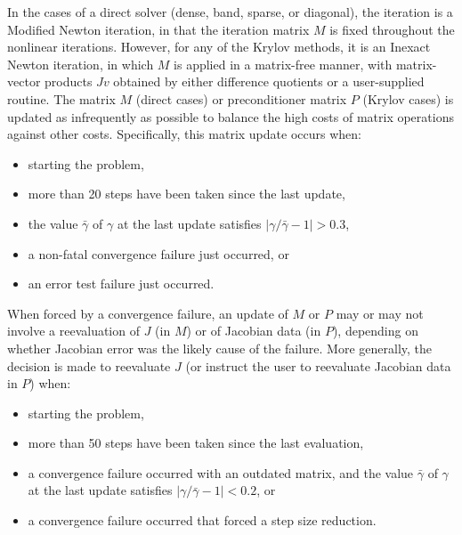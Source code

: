 In the cases of a direct solver (dense, band, sparse, or diagonal), the
iteration is a Modified Newton iteration, in that the iteration matrix
$M$ is fixed throughout the nonlinear iterations.  However, for any of
the Krylov methods, it is an Inexact Newton iteration, in which $M$ is
applied in a matrix-free manner, with matrix-vector products $Jv$
obtained by either difference quotients or a user-supplied routine.
The matrix $M$ (direct cases) or preconditioner matrix $P$ (Krylov
cases) is updated as infrequently as possible to balance the high costs
of matrix operations against other costs.  Specifically, this matrix
update occurs when:
\begin{itemize}
\item starting the problem,
\item more than 20 steps have been taken since the last update,
\item the value $\bar{\gamma}$ of $\gamma$ at the last update
satisfies $|\gamma/\bar{\gamma} - 1| > 0.3$,
\item a non-fatal convergence failure just occurred, or
\item an error test failure just occurred.
\end{itemize}
When forced by a convergence failure, an update of $M$ or $P$ may or
may not involve a reevaluation of $J$ (in $M$) or of Jacobian data
(in $P$), depending on whether Jacobian error was the likely cause of
the failure.  More generally, the decision is made to reevaluate $J$
(or instruct the user to reevaluate Jacobian data in $P$) when:
\begin{itemize}
\item starting the problem,
\item more than 50 steps have been taken since the last evaluation,
\item a convergence failure occurred with an outdated matrix, and
the value $\bar{\gamma}$ of $\gamma$ at the last update
satisfies $|\gamma/\bar{\gamma} - 1| < 0.2$, or
\item a convergence failure occurred that forced a step size reduction.
\end{itemize}

